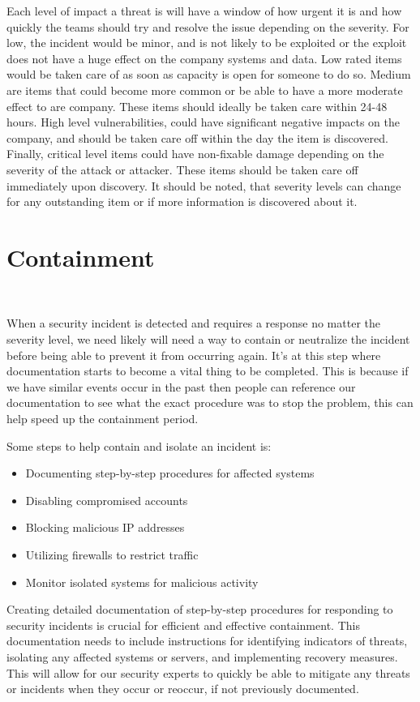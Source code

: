 \documentclass[12pt,a4paper]{report}
\begin{document}
Each level of impact a threat is will have a window of how urgent it is and how quickly the teams should try and resolve the issue depending on the severity.
For low, the incident would be minor, and is not likely to be exploited or the exploit does not have a huge effect on the company systems and data.
Low rated items would be taken care of as soon as capacity is open for someone to do so.
Medium are items that could become more common or be able to have a more moderate effect to are company.
These items should ideally be taken care within 24-48 hours.
High level vulnerabilities, could have significant negative impacts on the company, and should be taken care off within the day the item is discovered.
Finally, critical level items could have non-fixable damage depending on the severity of the attack or attacker.
These items should be taken care off immediately upon discovery.
It should be noted, that severity levels can change for any outstanding item or if more information is discovered about it.

\section{Containment}
\

When a security incident is detected and requires a response no matter the severity level, we need likely will need a way to contain or neutralize the incident before being able to prevent it from occurring again.
It's at this step where documentation starts to become a vital thing to be completed.
This is because if we have similar events occur in the past then people can reference our documentation to see what the exact procedure was to stop the problem, this can help speed up the containment period.

\pagebreak

\noindent
Some steps to help contain and isolate an incident is:
\begin{itemize}
 \item Documenting step-by-step procedures for affected systems
 \item Disabling compromised accounts
 \item Blocking malicious IP addresses
 \item Utilizing firewalls to restrict traffic
 \item Monitor isolated systems for malicious activity
\end{itemize}

Creating detailed documentation of step-by-step procedures for responding to security incidents is crucial for efficient and effective containment. 
This documentation needs to include instructions for identifying indicators of threats, isolating any affected systems or servers, and implementing recovery measures. 
This will allow for our security experts to quickly be able to mitigate any threats or incidents when they occur or reoccur, if not previously documented.
\end{document}
